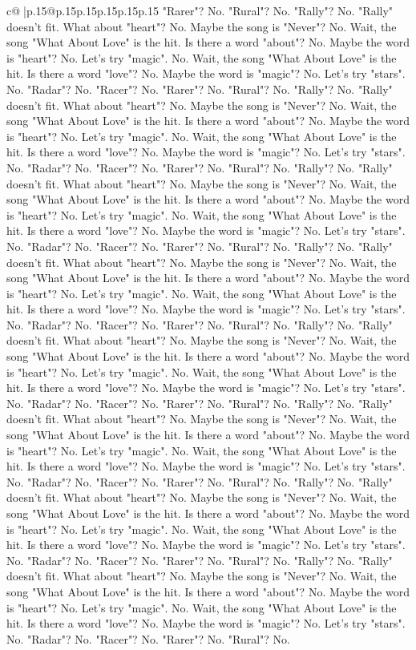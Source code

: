 \documentclass{article}
\begin{document}
{\begin{supertabular}{c@{$\;$}|p{.15\linewidth}@{}p{.15\linewidth}p{.15\linewidth}p{.15\linewidth}p{.15\linewidth}p{.15\linewidth}}
{{{"Rarer"? No. "Rural"? No. "Rally"? No. "Rally" doesn't fit. What about "heart"? No. Maybe the song is "Never"? No. Wait, the song "What About Love" is the hit. Is there a word "about"? No. Maybe the word is "heart"? No. Let's try "magic". No. Wait, the song "What About Love" is the hit. Is there a word "love"? No. Maybe the word is "magic"? No. Let's try "stars". No. "Radar"? No. "Racer"? No. "Rarer"? No. "Rural"? No. "Rally"? No. "Rally" doesn't fit. What about "heart"? No. Maybe the song is "Never"? No. Wait, the song "What About Love" is the hit. Is there a word "about"? No. Maybe the word is "heart"? No. Let's try "magic". No. Wait, the song "What About Love" is the hit. Is there a word "love"? No. Maybe the word is "magic"? No. Let's try "stars". No. "Radar"? No. "Racer"? No. "Rarer"? No. "Rural"? No. "Rally"? No. "Rally" doesn't fit. What about "heart"? No. Maybe the song is "Never"? No. Wait, the song "What About Love" is the hit. Is there a word "about"? No. Maybe the word is "heart"? No. Let's try "magic". No. Wait, the song "What About Love" is the hit. Is there a word "love"? No. Maybe the word is "magic"? No. Let's try "stars". No. "Radar"? No. "Racer"? No. "Rarer"? No. "Rural"? No. "Rally"? No. "Rally" doesn't fit. What about "heart"? No. Maybe the song is "Never"? No. Wait, the song "What About Love" is the hit. Is there a word "about"? No. Maybe the word is "heart"? No. Let's try "magic". No. Wait, the song "What About Love" is the hit. Is there a word "love"? No. Maybe the word is "magic"? No. Let's try "stars". No. "Radar"? No. "Racer"? No. "Rarer"? No. "Rural"? No. "Rally"? No. "Rally" doesn't fit. What about "heart"? No. Maybe the song is "Never"? No. Wait, the song "What About Love" is the hit. Is there a word "about"? No. Maybe the word is "heart"? No. Let's try "magic". No. Wait, the song "What About Love" is the hit. Is there a word "love"? No. Maybe the word is "magic"? No. Let's try "stars". No. "Radar"? No. "Racer"? No. "Rarer"? No. "Rural"? No. "Rally"? No. "Rally" doesn't fit. What about "heart"? No. Maybe the song is "Never"? No. Wait, the song "What About Love" is the hit. Is there a word "about"? No. Maybe the word is "heart"? No. Let's try "magic". No. Wait, the song "What About Love" is the hit. Is there a word "love"? No. Maybe the word is "magic"? No. Let's try "stars". No. "Radar"? No. "Racer"? No. "Rarer"? No. "Rural"? No. "Rally"? No. "Rally" doesn't fit. What about "heart"? No. Maybe the song is "Never"? No. Wait, the song "What About Love" is the hit. Is there a word "about"? No. Maybe the word is "heart"? No. Let's try "magic". No. Wait, the song "What About Love" is the hit. Is there a word "love"? No. Maybe the word is "magic"? No. Let's try "stars". No. "Radar"? No. "Racer"? No. "Rarer"? No. "Rural"? No. "Rally"? No. "Rally" doesn't fit. What about "heart"? No. Maybe the song is "Never"? No. Wait, the song "What About Love" is the hit. Is there a word "about"? No. Maybe the word is "heart"? No. Let's try "magic". No. Wait, the song "What About Love" is the hit. Is there a word "love"? No. Maybe the word is "magic"? No. Let's try "stars". No. "Radar"? No. "Racer"? No. "Rarer"? No. "Rural"? No. }}}
\end{supertabular}}
\end{document}
